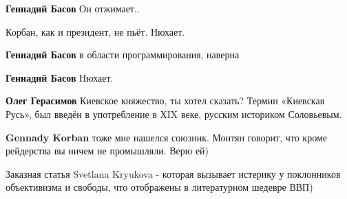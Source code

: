 \begin{itemize}
\begin{itemize}
\textbf{Геннадий Басов} Он отжимает..

 
Корбан, как и президент, не пьёт. Нюхает.

 
\textbf{Геннадий Басов} в области программирования, наверна

 
\textbf{Геннадий Басов} Нюхает.

 
\textbf{Олег Герасимов}
Киевское княжество, ты хотел сказать? Термин «Киевская Русь», был введён в употребление в ХIX веке, русским историком Соловьевым.

 
\textbf{Gennady Korban} тоже мне нашелся союзник. Монтян говорит, что кроме рейдерства вы ничем не промышляли. Верю ей)

\end{itemize}

 

Заказная статья Svetlana Kryukova - которая вызывает истерику у поклонников
объективизма и свободы, что отображены в литературном шедевре ВВП)


\end{itemize}
